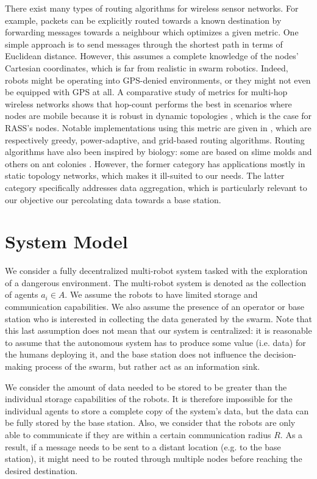 \documentclass[sigconf]{aamas}
\begin{document}
There exist many types of routing algorithms for wireless sensor
networks. For example, packets can be explicitly routed towards a known destination
by forwarding messages towards a neighbour which optimizes a given
metric. One simple approach is to send messages through the
shortest path in terms of Euclidean distance. However, this assumes a
complete knowledge of the nodes' Cartesian coordinates, which is far
from realistic in swarm robotics. Indeed, robots might be operating
into GPS-denied environments, or they might not even be equipped with
GPS at all. A comparative study of metrics for multi-hop wireless networks shows
that hop-count performs the best in scenarios where nodes are mobile
\cite{draves2004comparison} because it is robust in dynamic topologies
\cite{watteyne2009implementation}, which is the case for RASS's
nodes. Notable implementations using this metric are given in
\cite{kuruvila2005hop,zhang2014efficient,al2019efficient}, which are
respectively greedy, power-adaptive, and grid-based routing algorithms.
Routing algorithms have also been inspired by biology: some are based
on slime molds \cite{li2011slime,jiang2018toward} and others on ant
colonies \cite{jiang2018effective,liao2008data}. However, the
former category has applications mostly in static topology networks,
which makes it ill-suited to our needs. The latter category
specifically addresses data aggregation, which is particularly
relevant to our objective our percolating data towards a base station.


\section{System Model}
\label{systemmodel}

We consider a fully decentralized multi-robot system tasked with the
exploration of a dangerous environment. The multi-robot system is denoted as the collection 
of agents $a_i \in A$. We assume the robots to have limited storage and communication 
capabilities. We also assume the presence of an operator or base station who is interested 
in collecting the data generated by the swarm. Note that this last assumption does not mean 
that our system is centralized: it is reasonable to assume that the autonomous system has 
to produce some value (i.e. data) for the humans deploying it, and the base station does 
not influence the decision-making process of the swarm, but rather act as an 
information sink.

We consider the amount of data needed to be stored to be greater than the individual 
storage capabilities of the robots. It is therefore impossible for the individual agents 
to store a complete copy of the system’s data, but the data can be fully stored by the 
base station. Also, we consider that the robots are only able to communicate if they are 
within a certain communication radius $R$. As a result, if a message needs to be sent to a 
distant location (e.g. to the base station), it might need to be routed through multiple 
nodes before reaching the desired destination.
\end{document}
